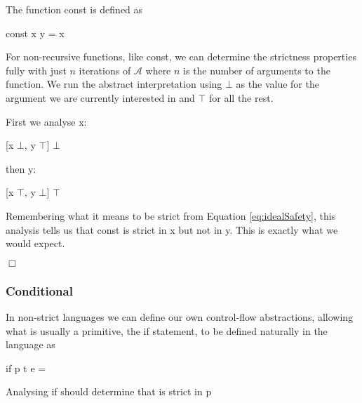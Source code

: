 The function \<const\> is defined as

\begin{haskell*}
const x y = x
\end{haskell*}

For non-recursive functions, like \<const\>, we can determine the strictness
properties fully with just $n$ iterations of $\mathcal{A}$ where $n$ is the
number of arguments to the function. We run the abstract interpretation using
$\bot$ as the value for the argument we are currently interested in and $\top$
for all the rest.

First we analyse \<x\>:
\begin{haskell*}
[x \mapsto \(\bot\), y \mapsto \(\top\)] \Rightarrow \(\bot\)
\end{haskell*}

then \<y\>:
\begin{haskell*}
[x \mapsto \(\top\), y \mapsto \(\bot\)] \Rightarrow \(\top\)
\end{haskell*}

Remembering what it means to be strict from Equation \ref{eq:idealSafety}, this
analysis tells us that \<const\> is strict in \<x\> but not in \<y\>. This is
exactly what we would expect.

\hfill$\Box$

\subsubsection{Conditional}

In non-strict languages we can define our own control-flow abstractions,
allowing what is usually a primitive, the \<if\> statement, to be defined
naturally in the language as

\begin{haskell*}
if p t e = 
\end{haskell*}

Analysing \<if\> should determine that is strict in \<p\>

\begin{haskell*}
 \hasphi
{}
\end{haskell*}

